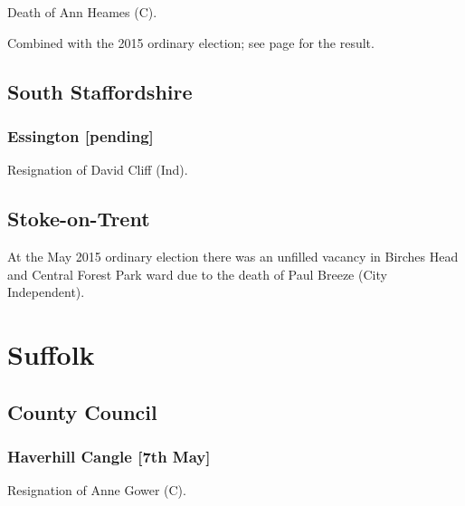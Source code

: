 \documentclass[a4paper,openany]{book}
\begin{document}
\begin{resultsiii}

Death of Ann Heames (C).

Combined with the 2015 ordinary election; see page \pageref{ClaytonNewcastleLyme} for the result.

\subsection*{South Staffordshire}

\subsubsection*{Essington \hspace*{\fill}\nolinebreak[1]%
\enspace\hspace*{\fill}
[pending]}


Resignation of David Cliff (Ind).

\subsection*{Stoke-on-Trent}

At the May 2015 ordinary election there was an unfilled vacancy in Birches Head and Central Forest Park ward due to the death of Paul Breeze (City Independent).

\section{Suffolk}

\subsection*{County Council}

\subsubsection*{Haverhill Cangle \hspace*{\fill}\nolinebreak[1]%
\enspace\hspace*{\fill}
[7th May]}


Resignation of Anne Gower (C).


\end{resultsiii}
\end{document}
